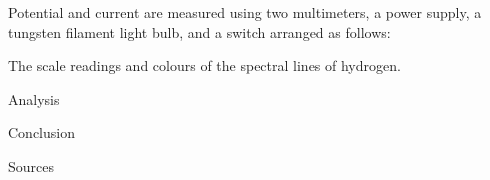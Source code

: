 \begin{paper}
	Potential and current are measured using two multimeters, a power supply, a tungsten filament light bulb, and a switch arranged as follows:
	
	

	{The scale readings and colours of the spectral lines of hydrogen.}\vspace{1em}


	Analysis


	Conclusion


	Sources

\papersource{}

\end{paper}


